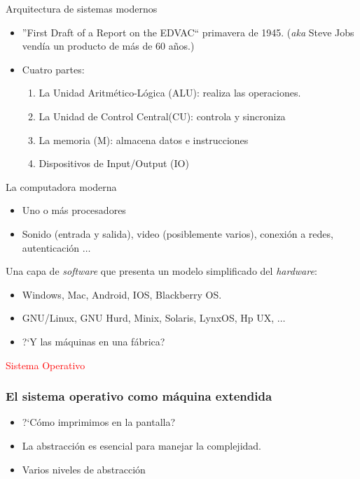 \begin{frame}{Arquitectura de sistemas modernos}
    \begin{itemize}
        \item ''First Draft of a Report on the EDVAC`` primavera de 1945. \pause 
            (\emph{aka} Steve Jobs vend\'ia un producto de m\'as de 60 a\~nos.) \pause
        \item Cuatro partes:
            \begin{enumerate}
                \item La Unidad Aritm\'etico-L\'ogica (ALU): realiza las operaciones.\pause
                \item La Unidad de Control Central(CU): controla y sincroniza \pause
                \item La memoria (M): almacena datos e instrucciones \pause
                \item Dispositivos de Input/Output (IO)
            \end{enumerate}
    \end{itemize}
\end{frame}


\begin{frame}{La computadora moderna}
    \begin{itemize}
        \item Uno o m\'as procesadores
        \item Sonido (entrada y salida), video (posiblemente varios), conexi\'on a redes, autenticaci\'on $\ldots$
    \end{itemize}
    \pause
    Una capa de \emph{software} que presenta un modelo simplificado del \emph{hardware}:
    \begin{itemize} 
        \item Windows, Mac, Android, IOS, Blackberry OS. \pause
        \item GNU/Linux, GNU Hurd, Minix, Solaris, LynxOS, Hp UX, $\ldots$ \pause
        \item ?`Y las m\'aquinas en una f\'abrica?
    \end{itemize}
    \pause
    \textcolor{red}{Sistema Operativo}
\end{frame}


\begin{frame}
    \frametitle{El sistema operativo como m\'aquina extendida}
    \begin{itemize}
        \item?`C\'omo imprimimos en la pantalla? \pause
        \item La abstracci\'on es esencial para manejar la complejidad. \pause
        \item Varios niveles de abstracci\'on
    \end{itemize}
\end{frame}


